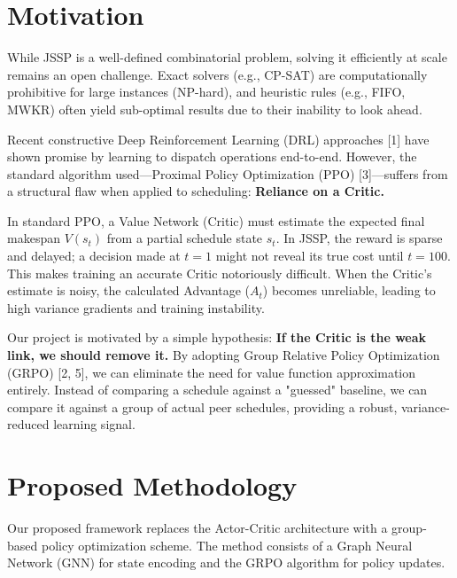 \documentclass{article}
\begin{document}
\section{Motivation}

While JSSP is a well-defined combinatorial problem, solving it efficiently at scale remains an open challenge. Exact solvers (e.g., CP-SAT) are computationally prohibitive for large instances (NP-hard), and heuristic rules (e.g., FIFO, MWKR) often yield sub-optimal results due to their inability to look ahead.

Recent constructive Deep Reinforcement Learning (DRL) approaches [1] have shown promise by learning to dispatch operations end-to-end. However, the standard algorithm used—Proximal Policy Optimization (PPO) [3]—suffers from a structural flaw when applied to scheduling: \textbf{Reliance on a Critic.}

In standard PPO, a Value Network (Critic) must estimate the expected final makespan $V(s_t)$ from a partial schedule state $s_t$. In JSSP, the reward is sparse and delayed; a decision made at $t=1$ might not reveal its true cost until $t=100$. This makes training an accurate Critic notoriously difficult. When the Critic's estimate is noisy, the calculated Advantage ($A_t$) becomes unreliable, leading to high variance gradients and training instability.

Our project is motivated by a simple hypothesis: \textbf{If the Critic is the weak link, we should remove it.} By adopting Group Relative Policy Optimization (GRPO) [2, 5], we can eliminate the need for value function approximation entirely. Instead of comparing a schedule against a "guessed" baseline, we can compare it against a group of actual peer schedules, providing a robust, variance-reduced learning signal.

\section{Proposed Methodology}

Our proposed framework replaces the Actor-Critic architecture with a group-based policy optimization scheme. The method consists of a Graph Neural Network (GNN) for state encoding and the GRPO algorithm for policy updates.
\end{document}
